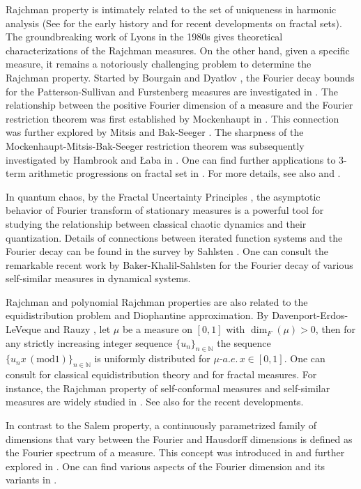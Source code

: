 \documentclass[12pt]{amsart}
\theoremstyle{definition}
\theoremstyle{remark}
\numberwithin{equation}{section}
\begin{document}
Rajchman property is intimately related to the set of uniqueness in harmonic analysis (See \cite{Ly95} for the early history and \cite{Li18,LS20,LS22,VY22} for recent developments on fractal sets).
The groundbreaking work of Lyons in the 1980s \cite{Ly085} gives theoretical characterizations of the Rajchman measures. On the other hand, given a specific measure, it remains a notoriously challenging problem to determine the Rajchman property.
Started by Bourgain and Dyatlov \cite{BD}, the Fourier decay bounds for the Patterson-Sullivan and Furstenberg measures are investigated in \cite{LNP,Li22, DKW}. The relationship between the positive Fourier dimension of a measure and the Fourier restriction theorem was first established by Mockenhaupt in \cite{M00}. This connection was further explored by Mitsis \cite{Mit02} and Bak-Seeger \cite{BS11}. The sharpness of the Mockenhaupt-Mitsis-Bak-Seeger restriction theorem was subsequently investigated by Hambrook and Łaba in \cite{HL13,HL16}.  One can find further applications to 3-term arithmetic progressions on fractal set in \cite{LP09}. For more details, see also \cite{Laba} and \cite{Pra23}.

In quantum chaos, by the Fractal Uncertainty Principles \cite{BD, DZ}, the asymptotic behavior of Fourier transform of stationary measures is a powerful tool for studying the relationship between classical chaotic dynamics and their quantization. 
Details of connections between iterated function systems and the Fourier  decay can be found in the survey by Sahlsten \cite{Sah}. One can consult the remarkable recent work by Baker-Khalil-Sahlsten \cite{BKS} for the  Fourier decay of various self-similar measures in dynamical systems.

Rajchman and polynomial Rajchman properties are also related to the equidistribution problem and  Diophantine approximation. By Davenport-Erdos-LeVeque \cite{DEL} and Rauzy \cite{Ra76}, let $\mu$ be a  measure on $[0,1]$ with $\dim_F(\mu)>0$, then for any  strictly increasing integer sequence $\{u_n\}_{n\in\mathbb{N}}$ the sequence $\{u_nx \,(\text{mod}1)\}_{n\in\mathbb{N}}$ is  uniformly distributed for $\mu$-$a.e. \, x\in [0,1]$.  One can consult \cite{Bug12} for classical equidistribution theory and \cite{HS15} for fractal measures. For instance, the Rajchman property of self-conformal measures and self-similar measures are widely studied in \cite{ARW,Bre21,Sol22,Rap22}. See also \cite[Section 6.1]{V23} for the recent developments.

In contrast to the Salem property, a continuously parametrized family of dimensions that vary between the Fourier and Hausdorff dimensions is defined as the Fourier spectrum of a measure. This concept was introduced in \cite{Fra24} and further explored in \cite{CF24}. One can find various aspects of the Fourier dimension
and its variants in \cite{ES17}.
\end{document}
